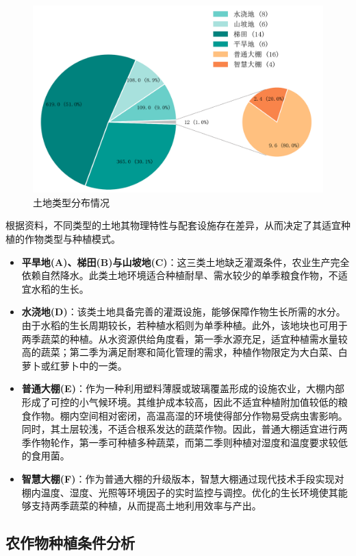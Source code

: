 \begin{figure}[htbp]
    \centering
    \includegraphics[width=\textwidth]{figs/2数据分析与预处理/土地类型分布.png}
    \caption{土地类型分布情况}
    \label{fig:land_distribution}
\end{figure}

根据资料，不同类型的土地其物理特性与配套设施存在差异，从而决定了其适宜种植的作物类型与种植模式。
\begin{itemize}
    \item \textbf{平旱地(A)、梯田(B)与山坡地(C)}：这三类土地缺乏灌溉条件，农业生产完全依赖自然降水。此类土地环境适合种植耐旱、需水较少的单季粮食作物，不适宜水稻的生长。
    \item \textbf{水浇地(D)}：该类土地具备完善的灌溉设施，能够保障作物生长所需的水分。由于水稻的生长周期较长，若种植水稻则为单季种植。此外，该地块也可用于两季蔬菜的种植。从水资源供给角度看，第一季水源充足，适宜种植需水量较高的蔬菜；第二季为满足耐寒和简化管理的需求，种植作物限定为大白菜、白萝卜或红萝卜中的一类。
    \item \textbf{普通大棚(E)}：作为一种利用塑料薄膜或玻璃覆盖形成的设施农业，大棚内部形成了可控的小气候环境。其维护成本较高，因此不适宜种植附加值较低的粮食作物。棚内空间相对密闭，高温高湿的环境使得部分作物易受病虫害影响。同时，其土层较浅，不适合根系发达的蔬菜作物。因此，普通大棚适宜进行两季作物轮作，第一季可种植多种蔬菜，而第二季则种植对湿度和温度要求较低的食用菌。
    \item \textbf{智慧大棚(F)}：作为普通大棚的升级版本，智慧大棚通过现代技术手段实现对棚内温度、湿度、光照等环境因子的实时监控与调控。优化的生长环境使其能够支持两季蔬菜的种植，从而提高土地利用效率与产出。
\end{itemize}

\subsection{农作物种植条件分析}

